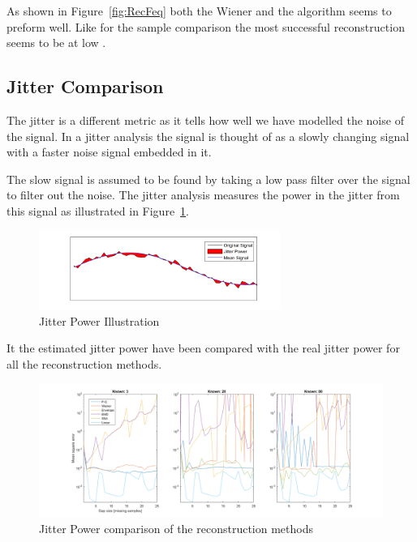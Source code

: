 As shown in Figure~\ref{fig:RecFeq} both the Wiener and the  algorithm seems to preform well. Like for the sample comparison the most successful reconstruction seems to be at low . 

\subsection{Jitter Comparison }
\label{T:jitterCom}

The jitter is a different metric as it tells how well we have modelled the noise of the signal. In a jitter analysis the signal is thought of as a slowly changing signal with a faster noise signal embedded in it.

The slow signal is assumed to be found by taking a low pass filter over the signal to filter out the noise. The jitter analysis measures the power in the jitter from this signal as illustrated in Figure~\ref{fig:JitPow}. 

\begin{figure}[H]
\centering
\includegraphics[width=0.7\textwidth]{billeder/JitterPower.png}
\caption{Jitter Power Illustration}
\label{fig:JitPow}
\end{figure}

It the estimated jitter power have been compared with the real jitter power for all the reconstruction methods. 

\begin{figure}[H]
\centering
\includegraphics[width=1\textwidth]{billeder/RecJitter.png}
\caption{Jitter Power comparison of the reconstruction methods}
\label{fig:RecJit}
\end{figure}


